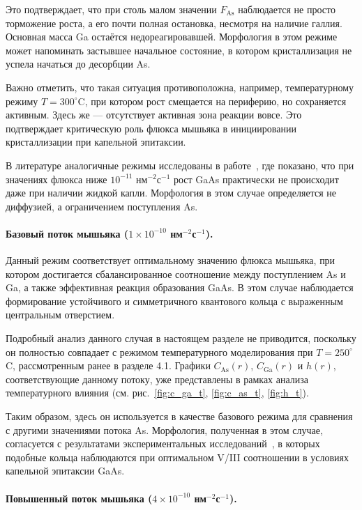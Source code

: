 \documentclass[14pt,oneside]{extarticle}
\begin{document}
Это подтверждает, что при столь малом значении $F_{\text{As}}$ наблюдается не просто торможение роста, а его почти полная остановка, несмотря на наличие галлия. Основная масса Ga остаётся недореагировавшей. Морфология в этом режиме может напоминать застывшее начальное состояние, в котором кристаллизация не успела начаться до десорбции As.

Важно отметить, что такая ситуация противоположна, например, температурному режиму $T = 300^\circ$C, при котором рост смещается на периферию, но сохраняется активным. Здесь же — отсутствует активная зона реакции вовсе. Это подтверждает критическую роль флюкса мышьяка в инициировании кристаллизации при капельной эпитаксии.

В литературе аналогичные режимы исследованы в работе~\cite{schmidt2021}, где показано, что при значениях флюкса ниже $10^{-11}$ нм$^{-2}$с$^{-1}$ рост GaAs практически не происходит даже при наличии жидкой капли. Морфология в этом случае определяется не диффузией, а ограничением поступления As.

\paragraph{Базовый поток мышьяка (\(1 \times 10^{-10}\) нм$^{-2}$с$^{-1}$).}

Данный режим соответствует оптимальному значению флюкса мышьяка, при котором достигается сбалансированное соотношение между поступлением As и Ga, а также эффективная реакция образования GaAs. В этом случае наблюдается формирование устойчивого и симметричного квантового кольца с выраженным центральным отверстием.

Подробный анализ данного случая в настоящем разделе не приводится, поскольку он полностью совпадает с режимом температурного моделирования при $T = 250^\circ$C, рассмотренным ранее в разделе 4.1. Графики $C_{\text{As}}(r)$, $C_{\text{Ga}}(r)$ и $h(r)$, соответствующие данному потоку, уже представлены в рамках анализа температурного влияния (см. рис.~\ref{fig:c_ga_t}, \ref{fig:c_as_t}, \ref{fig:h_t}).

Таким образом, здесь он используется в качестве базового режима для сравнения с другими значениями потока As. Морфология, полученная в этом случае, согласуется с результатами экспериментальных исследований~\cite{han2019,lee2022}, в которых подобные кольца наблюдаются при оптимальном V/III соотношении в условиях капельной эпитаксии GaAs.

\paragraph{Повышенный поток мышьяка (\(4 \times 10^{-10}\) нм$^{-2}$с$^{-1}$).}
\end{document}
